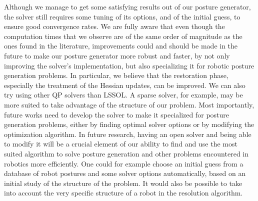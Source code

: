 Although we manage to get some satisfying results out of our posture generator, the solver still requires some tuning of its options, and of the initial guess, to ensure good convergence rates.
We are fully aware that even though the computation times that we observe are of the same order of magnitude as the ones found in the literature, improvements could and should be made in the future to make our posture generator more robust and faster, by not only improving the solver's implementation, but also specializing it for robotic posture generation problems.
In particular, we believe that the restoration phase, especially the treatment of the Hessian updates, can be improved.
We can also try using other QP solvers than LSSOL.
A sparse solver, for example, may be more suited to take advantage of the structure of our problem.
Most importantly, future works need to develop the solver to make it specialized for posture generation problems, either by finding optimal solver options or by modifying the optimization algorithm.
In future research, having an open solver and being able to modify it will be a crucial element of our ability to find and use the most suited algorithm to solve posture generation and other problems encountered in robotics more efficiently.
One could for example choose an initial guess from a database of robot postures and some solver options automatically, based on an initial study of the structure of the problem.
It would also be possible to take into account the very specific structure of a robot in the resolution algorithm.


